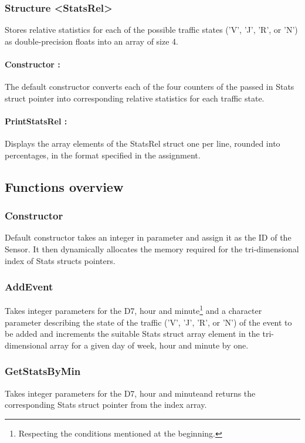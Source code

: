\documentclass[10pt]{article}
\begin{document}
\subsubsection*{Structure <StatsRel>}
Stores relative statistics for each of the possible traffic states ('V', 'J', 'R', or 'N') as double-precision floats into an array of size 4.

\paragraph{Constructor :}
The default constructor converts each of the four counters of the passed in Stats struct pointer into corresponding relative statistics for each traffic state.

\paragraph{PrintStatsRel :}
Displays the array elements of the StatsRel struct one per line, rounded into percentages, in the format specified in the assignment.

\subsection{Functions overview}

\subsubsection*{Constructor}
Default constructor takes an integer in parameter and assign it as the ID of the Sensor. It then dynamically allocates the memory required for the tri-dimensional index of Stats structs pointers.

\subsubsection*{AddEvent}
Takes integer parameters for the D7, hour and minute\footnote{ Respecting the conditions mentioned at the beginning.} and a character parameter describing the state of the traffic ('V', 'J', 'R', or 'N') of the event to be added and increments the suitable Stats struct array element in the tri-dimensional array for a given day of week, hour and minute by one.

\subsubsection*{GetStatsByMin}
Takes integer parameters for the D7, hour and minute\footnotemark[1] and returns the corresponding Stats struct pointer from the index array.
\end{document}
